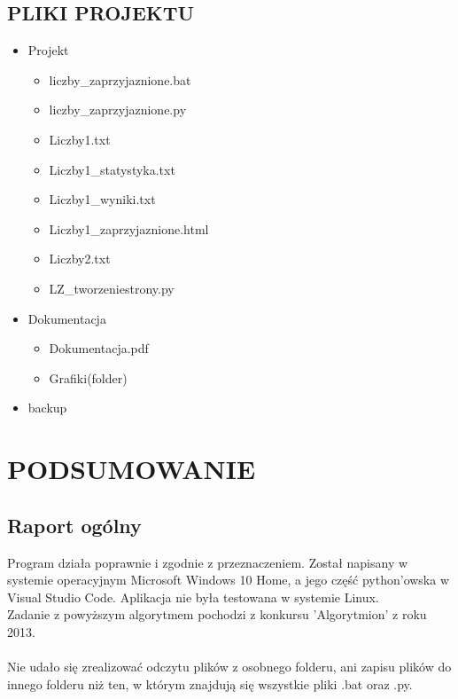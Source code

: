 \documentclass[12pt,a4paper]{article}
\begin{document}
	\begin{center}
	    \subsection{PLIKI PROJEKTU}
	\end{center}
	
	\begin{itemize}
	    \item Projekt
	    \begin{itemize}
	        \item liczby\_zaprzyjaznione.bat
	        \item liczby\_zaprzyjaznione.py
	        \item Liczby1.txt
	        \item Liczby1\_statystyka.txt
	        \item Liczby1\_wyniki.txt
	        \item Liczby1\_zaprzyjaznione.html
	        \item Liczby2.txt
	        \item LZ\_tworzeniestrony.py
	    \end{itemize}
	    \item Dokumentacja
	    \begin{itemize}
	        \item Dokumentacja.pdf
	        \item Grafiki(folder)
	    \end{itemize}
	    \item backup
	\end{itemize}
	
	\newpage
	\section{PODSUMOWANIE}
	\subsection{Raport ogólny}
	\hspace{20} Program działa poprawnie i zgodnie z przeznaczeniem. Został napisany w systemie operacyjnym Microsoft Windows 10 Home, a jego część python'owska w Visual Studio Code. Aplikacja nie była testowana w systemie Linux. \\ Zadanie z powyższym algorytmem pochodzi z konkursu 'Algorytmion' z roku 2013.\\ \\
	Nie udało się zrealizować odczytu plików z osobnego folderu, ani zapisu plików do innego folderu niż ten, w którym znajdują się wszystkie pliki .bat oraz .py.
\end{document}
